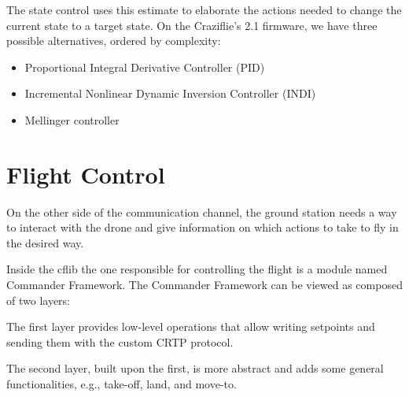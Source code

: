 The state control uses this estimate to elaborate the actions needed to change the current state to a target state.
On the Craziflie's 2.1 firmware, we have three possible alternatives, ordered by complexity:
\begin{itemize}
    \item Proportional Integral Derivative Controller (PID)
    \item Incremental Nonlinear Dynamic Inversion Controller (INDI)
    \item Mellinger controller
\end{itemize}


\section{Flight Control}\label{sec:flight_control}
On the other side of the communication channel, the ground station needs a way to interact with the drone and give information on which actions to take to fly in the desired way.

Inside the cflib the one responsible for controlling the flight is a module named Commander Framework.
The Commander Framework can be viewed as composed of two layers:

The first layer provides low-level operations that allow writing setpoints and sending them with the custom CRTP protocol.

The second layer, built upon the first, is more abstract and adds some general functionalities, e.g., take-off, land, and move-to.